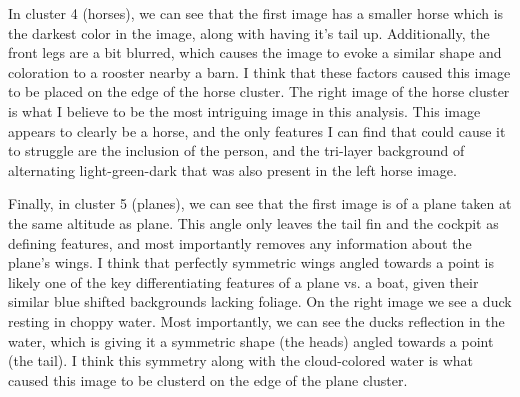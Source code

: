 \documentclass[12pt]{article}
\begin{document}
In cluster 4 (horses), we can see that the first image has a smaller horse which is the darkest color in the image, along
with having it's tail up. Additionally, the front legs are a bit blurred, which causes the image to evoke a similar shape 
and coloration to a rooster nearby a barn. I think that these factors caused this image to be placed on the edge of the 
horse cluster. The right image of the horse cluster is what I believe to be the most intriguing image in this analysis.
This image appears to clearly be a horse, and the only features I can find that could cause it to struggle are the 
inclusion of the person, and the tri-layer background of alternating light-green-dark that was also present in the left 
horse image. 

Finally, in cluster 5 (planes), we can see that the first image is of a plane taken at the same altitude as plane. This 
angle only leaves the tail fin and the cockpit as defining features, and most importantly removes any information 
about the plane's wings. I think that perfectly symmetric wings angled towards a point is likely one of the key differentiating features of 
a plane vs. a boat, given their similar blue shifted backgrounds lacking foliage. On the right image we see a duck 
resting in choppy water. Most importantly, we can see the ducks reflection in the water, which is giving it a symmetric shape
(the heads) angled towards a point (the tail). I think this symmetry along with the cloud-colored water is what caused this 
image to be clusterd on the edge of the plane cluster.
\end{document}
